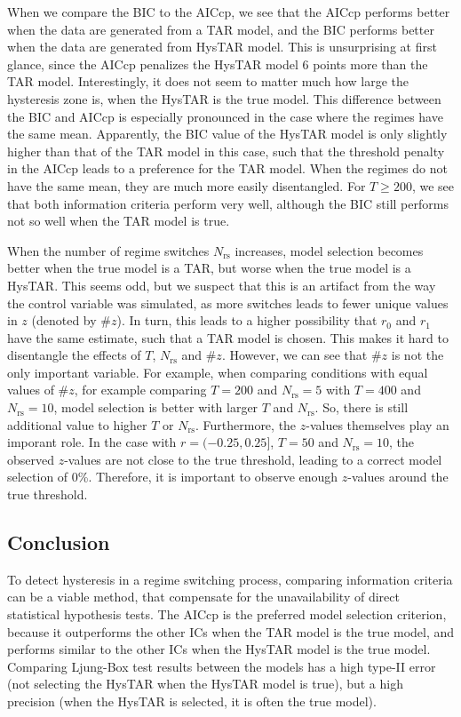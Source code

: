 \documentclass{article}
\begin{document}
When we compare the BIC to the AICcp, we see that the AICcp performs better when the data are generated from a TAR model, and the BIC performs better when the data are generated from HysTAR model. This is unsurprising at first glance, since the AICcp penalizes the HysTAR model 6 points more than the TAR model. Interestingly, it does not seem to matter much how large the hysteresis zone is, when the HysTAR is the true model.
	This difference between the BIC and AICcp is especially pronounced in the case where the regimes have the same mean. Apparently, the BIC value of the HysTAR model is only slightly higher than that of the TAR model in this case, such that the threshold penalty in the AICcp leads to a preference for the TAR model. 
	When the regimes do not have the same mean, they are much more easily disentangled. For $T\ge 200$, we see that both information criteria perform very well, although the BIC still performs not so well when the TAR model is true.

When the number of regime switches $N_{\mathrm{rs}}$ increases, model selection becomes better when the true model is a TAR, but worse when the true model is a HysTAR. 
This seems odd, but we suspect that this is an artifact from the way the control variable was simulated, as more switches leads to fewer unique values in $z$ (denoted by \#$z$). In turn, this leads to a higher possibility that $r_0$ and $r_1$ have the same estimate, such that a TAR model is chosen.
This makes it hard to disentangle the effects of $T$, $N_{\mathrm{rs}}$ and \#$z$.
However, we can see that \#$z$ is not the only important variable.
For example, when comparing conditions with equal values of \#$z$, for example comparing $T = 200$ and $N_{\mathrm{rs}} = 5$ with $T = 400$ and $N_{\mathrm{rs}} = 10$, model selection is better with larger $T$ and $N_{\mathrm{rs}}$.
So, there is still additional value to higher $T$ or $N_{\mathrm{rs}}$.
Furthermore, the $z$-values themselves play an imporant role. 
In the case with $r = (-0.25, 0.25]$, $T = 50$ and $N_{\mathrm{rs}} = 10$, the observed $z$-values are not close to the true threshold, leading to a correct model selection of 0\%.
Therefore, it is important to observe enough $z$-values around the true threshold.

\subsection{Conclusion}
To detect hysteresis in a regime switching process, comparing information criteria can be a viable method, that compensate for the unavailability of direct statistical hypothesis tests. 
The AICcp is the preferred model selection criterion, because it outperforms the other ICs when the TAR model is the true model, and performs similar to the other ICs when the HysTAR model is the true model.
Comparing Ljung-Box test results between the models has a high type-II error (not selecting the HysTAR when the HysTAR model is true), but a high precision (when the HysTAR is selected, it is often the true model).
\end{document}
